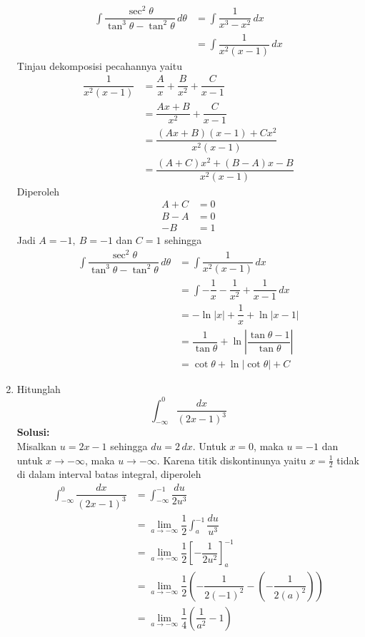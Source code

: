 \documentclass{article}
\begin{document}
\begin{enumerate}
	\begin{align*}
	\int \dfrac{\sec^2\theta}{\tan^3\theta-\tan^2\theta}\, d\theta &= \int \dfrac{1}{x^3-x^2}\, dx\\
	&= \int \dfrac{1}{x^2(x-1)}\, dx
	\end{align*}
	Tinjau dekomposisi pecahannya yaitu
	\begin{align*}
	\dfrac{1}{x^2(x-1)} &= \dfrac{A}{x} + \dfrac{B}{x^2} + \dfrac{C}{x-1}\\
	&= \dfrac{Ax+B}{x^2} + \dfrac{C}{x-1}\\
	&= \dfrac{(Ax+B)(x-1)+Cx^2}{x^2(x-1)}\\
	&= \dfrac{(A+C)x^2+(B-A)x-B}{x^2(x-1)}
	\end{align*}
	Diperoleh 
	\begin{align*}
	A+C &= 0\\
	B-A &= 0\\
	-B & = 1
	\end{align*}
	Jadi $A=-1, ~B=-1$ dan $C=1$ sehingga 
	\begin{align*}
	\int \dfrac{\sec^2\theta}{\tan^3\theta-\tan^2\theta}\, d\theta &= \int \dfrac{1}{x^2(x-1)}\, dx \\
	&= \int -\dfrac{1}{x} - \dfrac{1}{x^2} +\dfrac{1}{x-1} \, dx \\
	&= -\ln|x|+\dfrac{1}{x} +\ln|x-1|\\
	&= \dfrac{1}{\tan \theta} + \ln\left|\dfrac{\tan\theta -1}{\tan\theta}\right|\\
	&= \cot \theta +\ln|\cot\theta|+C
	\end{align*}
	\newpage
	\item Hitunglah $$ \int_{-\infty}^0 \dfrac{dx}{(2x-1)^3}$$
	\textbf{Solusi:}\\
	Misalkan $u=2x-1$ sehingga $du = 2\, dx$. Untuk $x=0$, maka $u=-1$ dan untuk $x\rightarrow -\infty$, maka $u\rightarrow -\infty$. Karena titik diskontinunya yaitu $x=\frac{1}{2}$ tidak di dalam interval batas integral, diperoleh  
	\begin{align*}
	\int_{-\infty}^0 \dfrac{dx}{(2x-1)^3} &= \int_{-\infty}^{-1} \dfrac{du}{2u^3}\\
	&= \lim_{a\rightarrow -\infty} \dfrac{1}{2}\int_a^{-1} \dfrac{du}{u^3}\\
	&= \lim_{a\rightarrow -\infty} \dfrac{1}{2}\left[-\dfrac{1}{2u^2}\right]^{-1}_a\\
	&= \lim_{a\rightarrow -\infty} \dfrac{1}{2}\left(-\dfrac{1}{2(-1)^2}-\left(-\dfrac{1}{2(a)^2}\right)\right)\\
	&= \lim_{a\rightarrow -\infty} \dfrac{1}{4}\left(\dfrac{1}{a^2}-1\right)\\

\end{align*}
\end{enumerate}
\end{document}
